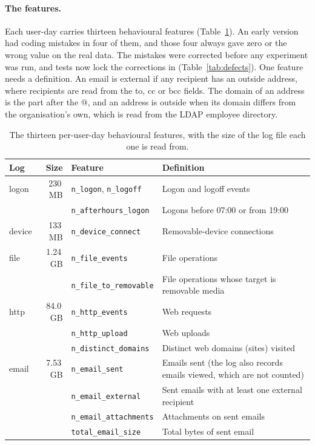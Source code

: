 \documentclass[a4paper,12pt]{article}
\begin{document}
\paragraph{The features.} Each user-day carries thirteen behavioural features (Table~\ref{tab:features}). An early version had coding mistakes in four of them, and those four always gave zero or the wrong value on the real data. The mistakes were corrected before any experiment was run, and tests now lock the corrections in (Table~\ref{tab:defects}). One feature needs a definition. An email is external if any recipient has an outside address, where recipients are read from the to, cc or bcc fields. The domain of an address is the part after the @, and an address is outside when its domain differs from the organisation's own, which is read from the LDAP employee directory.

\begin{table}[htbp]
\centering
\caption{The thirteen per-user-day behavioural features, with the size of the log file each one is read from.}
\label{tab:features}
\small
\setlength{\tabcolsep}{4pt}
\begin{tabular}{@{}l r l p{6.0cm}@{}}
\toprule
\textbf{Log} & \textbf{Size} & \textbf{Feature} & \textbf{Definition} \\
\midrule
logon  & 230\,MB & \texttt{n\_logon}, \texttt{n\_logoff} & Logon and logoff events \\
       & & \texttt{n\_afterhours\_logon} & Logons before 07:00 or from 19:00 \\
device & 133\,MB & \texttt{n\_device\_connect} & Removable-device connections \\
file   & 1.24\,GB & \texttt{n\_file\_events} & File operations \\
       & & \texttt{n\_file\_to\_removable} & File operations whose target is removable media \\
http   & 84.0\,GB & \texttt{n\_http\_events} & Web requests \\
       & & \texttt{n\_http\_upload} & Web uploads \\
       & & \texttt{n\_distinct\_domains} & Distinct web domains (sites) visited \\
email  & 7.53\,GB & \texttt{n\_email\_sent} & Emails sent (the log also records emails viewed, which are not counted) \\
       & & \texttt{n\_email\_external} & Sent emails with at least one external recipient \\
       & & \texttt{n\_email\_attachments} & Attachments on sent emails \\
       & & \texttt{total\_email\_size} & Total bytes of sent email \\
\bottomrule
\end{tabular}
\end{table}
\end{document}
